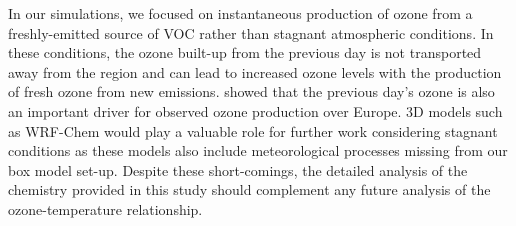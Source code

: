In our simulations, we focused on instantaneous production of ozone from a freshly-emitted source of VOC rather than stagnant atmospheric conditions.
In these conditions, the ozone built-up from the previous day is not transported away from the region and can lead to increased ozone levels with the production of fresh ozone from new emissions.  
\citet{Otero:2016} showed that the previous day's ozone is also an important driver for observed ozone production over Europe.
3D models such as WRF-Chem would play a valuable role for further work considering stagnant conditions as these models also include meteorological processes missing from our box model set-up.
Despite these short-comings, the detailed analysis of the chemistry provided in this study should complement any future analysis of the ozone-temperature relationship.
